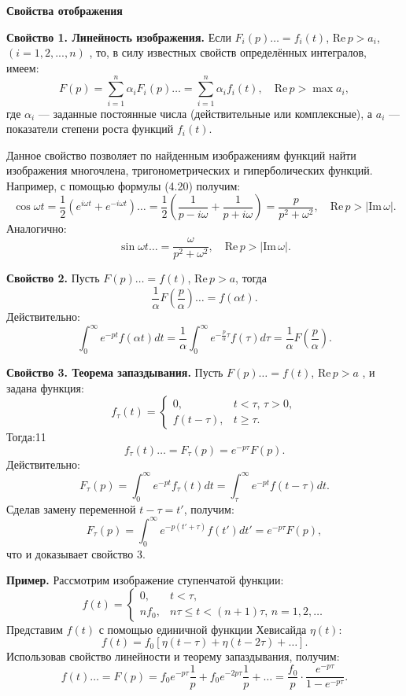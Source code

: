 \textbf{Свойства отображения}{




\textbf{Свойство 1. Линейность изображения.}  
Если $F_i(p) \dots = f_i(t)$, $\mathrm{Re}\,p > a_i$, $(i = 1, 2, ..., n)$ , то, в силу известных свойств определённых интегралов, имеем:
\[
F(p) = \sum_{i=1}^n \alpha_i F_i(p) \dots = \sum_{i=1}^n \alpha_i f_i(t), \quad \mathrm{Re}\,p > \max a_i, \tag{4.20}
\]
где $\alpha_i$ — заданные постоянные числа (действительные или комплексные), а $a_i$ — показатели степени роста функций $f_i(t)$.

Данное свойство позволяет по найденным изображениям функций найти изображения многочлена, тригонометрических и гиперболических функций. Например, с помощью формулы (4.20) получим:
\[
\cos \omega t = \frac{1}{2} \left( e^{i\omega t} + e^{-i\omega t} \right) \dots = \frac{1}{2} \left( \frac{1}{p - i\omega} + \frac{1}{p + i\omega} \right) = \frac{p}{p^2 + \omega^2}, \quad \mathrm{Re}\,p > |\mathrm{Im}\,\omega|.\tag{4.21}
\]
Аналогично:
\[
\sin \omega t \dots = \frac{\omega}{p^2 + \omega^2}, \quad \mathrm{Re}\,p > |\mathrm{Im}\,\omega|. \tag{4.22}
\]

\textbf{Свойство 2.}  
Пусть $F(p) \dots = f(t)$, $\mathrm{Re}\,p > a$, тогда
\[
\frac{1}{\alpha} F\left(\frac{p}{\alpha}\right) \dots = f(\alpha t). \tag{4.23}
\]
Действительно:
\[
\int_{0}^{\infty} e^{-pt} f(\alpha t) dt = \frac{1}{\alpha} \int_{0}^{\infty} e^{-\frac{p}{\alpha} \tau} f(\tau) d\tau = \frac{1}{\alpha} F\left(\frac{p}{\alpha}\right). \tag{4.24}
\]

\textbf{Свойство 3. Теорема запаздывания.}  
Пусть $F(p) \dots = f(t)$, $\mathrm{Re}\,p > a$ , и задана функция:
\[
f_\tau(t) =
\begin{cases}
0, & t < \tau, \, \tau > 0, \\
f(t - \tau), & t \geq \tau.\tag{11.7}
\end{cases}
\]
Тогда:11
\[
f_\tau(t) \dots = F_\tau(p) = e^{-p\tau} F(p). \tag{4.25}
\]
Действительно:
\[
F_\tau(p) = \int_{0}^{\infty} e^{-pt} f_\tau(t) dt = \int_{\tau}^{\infty} e^{-pt} f(t - \tau) dt. \tag{4.25}
\]
Сделав замену переменной $t - \tau = t'$, получим:
\[
F_\tau(p) = \int_{0}^{\infty} e^{-p(t' + \tau)} f(t') dt' = e^{-p\tau} F(p), \tag{4.27}
\]
что и доказывает свойство 3.

\textbf{Пример.} Рассмотрим изображение ступенчатой функции:
\[
f(t) =
\begin{cases}
0, & t < \tau, \\
nf_0, & n\tau \leq t < (n + 1)\tau, \, n = 1, 2, \dots \tag{4.28}
\end{cases}
\]
Представим $f(t)$ с помощью единичной функции Хевисайда $\eta(t)$:
\[
f(t) = f_0 [\eta(t - \tau) + \eta(t - 2\tau) + \dots ]. \tag{4.29}
\]
Использовав свойство линейности и теорему запаздывания, получим:
\[
f(t) \dots = F(p) = f_0 e^{-p\tau} \frac{1}{p} + f_0 e^{-2p\tau} \frac{1}{p} + \dots = \frac{f_0}{p} \cdot \frac{e^{-p\tau}}{1 - e^{-p\tau}}. \tag{4.30}
\]

}
